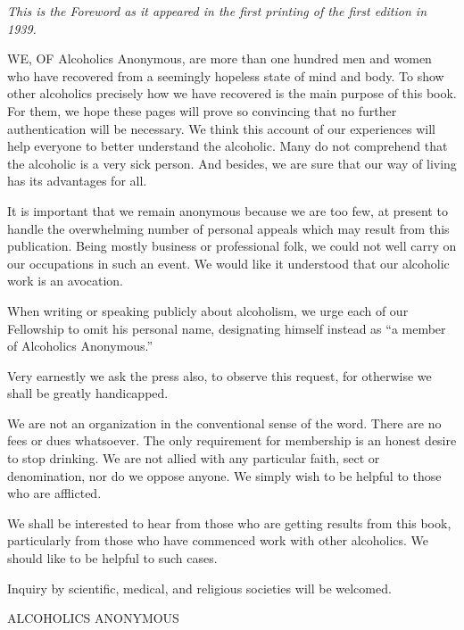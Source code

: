 
\bbChapterPreamble


\begin{biblechapter}
 \begin{centering}\emph{
    This is the Foreword as it appeared in the first 
    printing of the first edition in 1939.
}
\end{centering}

    WE, OF Alcoholics Anonymous, 
    are more than one hundred men and women 
    who have recovered from a seemingly hopeless state 
    of mind and body. 
\verse To show other alcoholics precisely how we have recovered 
    is the main purpose of this book. 
\verse For them, we hope these pages will prove so convincing 
    that no further authentication will be necessary. 
\verse We think this account of our experiences will help everyone 
    to better understand the alcoholic. 
\verse Many do not comprehend that the alcoholic is a very sick person.
\verse And besides, 
    we are sure that our way of living has its advantages for all. 

    It is important that we remain anonymous 
    because we are too few, at present 
    to handle the overwhelming number of personal appeals 
    which may result from this publication. 
\verse Being mostly business or professional folk, 
    we could not well carry on our occupations in such an event. 
\verse We would like it understood that our alcoholic work is an avocation. 

\verse When writing or speaking publicly about alcoholism, 
    we urge each of our Fellowship to omit his personal name, 
    designating himself instead as 
    “a member of Alcoholics Anonymous.”

    Very earnestly we ask the press also, 
    to observe this request, 
    for otherwise we shall be greatly handicapped.

    We are not an organization in the conventional sense of the word.
\verse There are no fees or dues whatsoever. 
\verse The only requirement for membership is an honest desire to stop drinking. 
\verse We are not allied with any particular faith, sect or denomination, 
    nor do we oppose anyone.
\verse We simply wish to be helpful to those who are afflicted. 

    We shall be interested to hear from those 
    who are getting results from this book, 
    particularly from those who have commenced work with other alcoholics.
\verse We should like to be helpful to such cases. 

\verse Inquiry by scientific, medical, and religious societies 
    will be welcomed. 

\verse ALCOHOLICS ANONYMOUS
\end{biblechapter}

